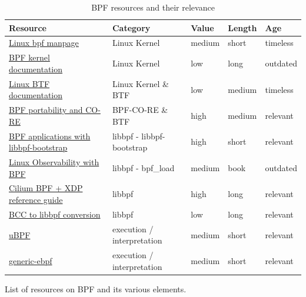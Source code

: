 \documentclass[conference]{IEEEtran}
\begin{document}
\begin{table}[h!]
	\caption{BPF resources and their relevance}
	\label{table:bpfresources}
	\centering
	\begin{adjustbox}{width=0.5\textwidth}
		\begin{threeparttable}[]
			\begin{tabular}{lllll}
				\toprule
				\textbf{Resource} & \textbf{Category} & \textbf{Value} &
				\textbf{Length} & \textbf{Age} \\
				\midrule
				\href{https://www.man7.org/linux/man-pages/man2/bpf.2.html}{Linux bpf manpage} &
				Linux Kernel & medium & short & timeless \\
				\href{https://www.kernel.org/doc/Documentation/networking/filter.txt}{BPF kernel documentation} &
				Linux Kernel & low & long & outdated \\
				\href{https://www.kernel.org/doc/html/latest/bpf/btf.html}{Linux BTF documentation} &
				Linux Kernel \& BTF & low & medium & timeless \\
				\href{https://facebookmicrosites.github.io/bpf/blog/2020/02/19/bpf-portability-and-co-re.html}{BPF portability and CO-RE} &
				BPF-CO-RE \& BTF & high & medium & relevant \\
				\href{https://nakryiko.com/posts/libbpf-bootstrap/}{BPF applications with libbpf-bootstrap} &
				libbpf - libbpf-bootstrap & high & short & relevant \\
				\href{https://www.oreilly.com/library/view/linux-observability-with/9781492050193/}{Linux Observability with BPF} &
				libbpf - bpf\_load & medium & book & outdated \\
				\href{https://facebookmicrosites.github.io/bpf/blog/2020/02/19/bpf-portability-and-co-re.html}{Cilium BPF + XDP reference guide} &
				libbpf & high & long & relevant \\
				\href{https://facebookmicrosites.github.io/bpf/blog/2020/02/20/bcc-to-libbpf-howto-guide.html}{BCC to libbpf conversion} &
				libbpf & low & long & relevant \\
				\href{https://github.com/iovisor/ubpf}{uBPF} &
				execution / interpretation & medium & short & relevant \\
				\href{https://github.com/generic-ebpf/generic-ebpf}{generic-ebpf} &
				execution / interpretation & medium & short & relevant \\
				\bottomrule
			\end{tabular}
			\begin{tablenotes}
				\centering List of resources on BPF and its various elements.
			\end{tablenotes}
		\end{threeparttable}
	\end{adjustbox}
\end{table}
\end{document}
